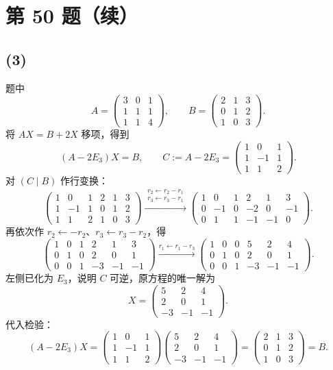 \documentclass[11pt,a4paper,fontset=fandol]{ctexart}
\newcommand{\ans}[1]{\boxed{#1}}
\newcommand{\parttitle}[1]{\Needspace{7\baselineskip}\subsection*{#1}}
\begin{document}
\newpage
\section*{第 50 题（续）}
\parttitle{(3)}
题中
\[
A=\begin{pmatrix}3&0&1\\1&1&1\\1&1&4\end{pmatrix},\qquad
B=\begin{pmatrix}2&1&3\\0&1&2\\1&0&3\end{pmatrix}.
\]
将 $AX=B+2X$ 移项，得到
\[
(A-2E_3)X=B,\qquad
C:=A-2E_3=\begin{pmatrix}1&0&1\\1&-1&1\\1&1&2\end{pmatrix}.
\]
对 $(C\mid B)$ 作行变换：
\[
\left(\begin{array}{rrr|rrr}
1&0&1&2&1&3\\1&-1&1&0&1&2\\1&1&2&1&0&3
\end{array}\right)
\xrightarrow{\substack{r_2\leftarrow r_2-r_1\\r_3\leftarrow r_3-r_1}}
\left(\begin{array}{rrr|rrr}
1&0&1&2&1&3\\0&-1&0&-2&0&-1\\0&1&1&-1&-1&0
\end{array}\right).
\]
再依次作 $r_2\leftarrow-r_2$、$r_3\leftarrow r_3-r_2$，得
\[
\left(\begin{array}{rrr|rrr}
1&0&1&2&1&3\\0&1&0&2&0&1\\0&0&1&-3&-1&-1
\end{array}\right)
\xrightarrow{r_1\leftarrow r_1-r_3}
\left(\begin{array}{rrr|rrr}
1&0&0&5&2&4\\0&1&0&2&0&1\\0&0&1&-3&-1&-1
\end{array}\right).
\]
左侧已化为 $E_3$，说明 $C$ 可逆，原方程的唯一解为
\[
\ans{X=\begin{pmatrix}5&2&4\\2&0&1\\-3&-1&-1\end{pmatrix}}.
\]
代入检验：
\[
(A-2E_3)X
=\begin{pmatrix}1&0&1\\1&-1&1\\1&1&2\end{pmatrix}
\begin{pmatrix}5&2&4\\2&0&1\\-3&-1&-1\end{pmatrix}
=\begin{pmatrix}2&1&3\\0&1&2\\1&0&3\end{pmatrix}=B.
\]
\end{document}
